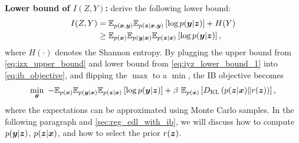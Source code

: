\textbf{Lower bound of $I(Z,Y)$:} \citet{wieczorek2020difference} derive the following lower bound:
\begin{equation}
    \begin{aligned}
        I(Z, Y) &= \mathbb{E}_{p(\bm{x}, \bm{y})} \mathbb{E}_{p(\bm{z} | \bm{x}, \bm{y})} \left[\log p(\bm{y} | \bm{z}) \right] + H(Y) \\
        &\geq \mathbb{E}_{p(\bm{x})} \mathbb{E}_{p(\bm{y} | \bm{x})} \mathbb{E}_{p(\bm{z} | \bm{x})}\left[\log p(\bm{y} | \bm{z}) \right],
    \end{aligned}
    \label{eq:iyz_lower_bound_1}
\end{equation}
where $H(\cdot)$ denotes the Shannon entropy. By plugging the upper bound from \cref{eq:izx_upper_bound} and lower bound from \cref{eq:iyz_lower_bound_1} into \cref{eq:ib_objective}, and flipping the $\max$ to a $\min$, the IB objective becomes 
\begin{equation}
    \begin{aligned}
        \min_{\thetav} \ - \mathbb{E}_{p(\xv)} \mathbb{E}_{p(\yv | \xv)} \mathbb{E}_{p(\zv | \xv)}\left[\log p(\yv | \zv) \right] + \beta \ \mathbb{E}_{p(\xv)} \left[\dkl{p(\zv | \xv) \| r(\zv)}\right],
    \end{aligned}
    \label{eq:loss_ib}
\end{equation}
where the expectations can be approximated using Monte Carlo samples. In the following paragraph and \cref{sec:reg_edl_with_ib}, we will discuss how to compute $p(\bm{y} | \bm{z})$, $p(\bm{z} | \bm{x})$, and how to select the prior $r(\bm{z})$.

